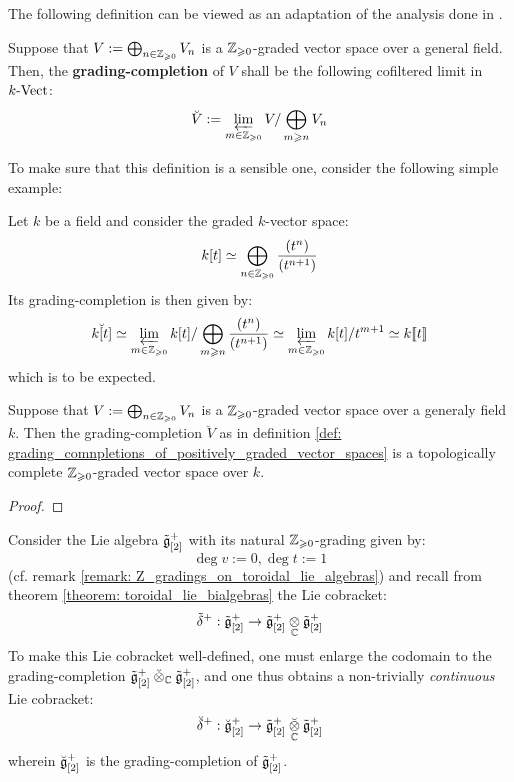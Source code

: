         The following definition can be viewed as an adaptation of the analysis done in  \cite[Appendix A]{wendlandt_formal_shift_operators_on_yangian_doubles}.
        \begin{definition} \label{def: grading_comnpletions_of_positively_graded_vector_spaces}
            Suppose that $V := \bigoplus_{n \in \mathbb{Z}_{\geqslant 0}} V_n$ is a $\mathbb{Z}_{\geqslant 0}$-graded vector space over a general field. Then, the \textbf{grading-completion} of $V$ shall be the following cofiltered limit in $k\text{-}\mathrm{Vect}$:
                $$\breve{V} := \varprojlim_{m \in \mathbb{Z}_{\geqslant 0}} V/\bigoplus_{m \geqslant n} V_n$$
        \end{definition}
        To make sure that this definition is a sensible one, consider the following simple example:
        \begin{example}
            Let $k$ be a field and consider the graded $k$-vector space:
                $$k[t] \simeq \bigoplus_{n \in \mathbb{Z}_{\geqslant 0}} \frac{(t^n)}{(t^{n + 1})}$$
            Its grading-completion is then given by:
                $$\breve{k[t]} \simeq \varprojlim_{m \in \mathbb{Z}_{\geqslant 0}} k[t]/\bigoplus_{m \geqslant n} \frac{(t^n)}{(t^{n + 1})} \simeq \varprojlim_{m \in \mathbb{Z}_{\geqslant 0}} k[t]/t^{m + 1} \simeq k[\![t]\!]$$
            which is to be expected.
        \end{example}
        \begin{lemma} \label{lemma: grading_completions_are_topologically_complete}
            Suppose that $V := \bigoplus_{n \in \mathbb{Z}_{\geqslant 0}} V_n$ is a $\mathbb{Z}_{\geqslant 0}$-graded vector space over a generaly field $k$. Then the grading-completion $\breve{V}$ as in definition \ref{def: grading_comnpletions_of_positively_graded_vector_spaces} is a topologically complete $\mathbb{Z}_{\geqslant 0}$-graded vector space over $k$.
        \end{lemma}
            \begin{proof}
                
            \end{proof}
        \begin{theorem} \label{theorem: toroidal_topological_lie_bialgebras}
            Consider the Lie algebra $\tilde{\mathfrak{g}}_{[2]}^+$ with its natural $\mathbb{Z}_{\geqslant 0}$-grading given by:
                $$\deg v := 0, \deg t := 1$$
            (cf. remark \ref{remark: Z_gradings_on_toroidal_lie_algebras}) and recall from theorem \ref{theorem: toroidal_lie_bialgebras} the Lie cobracket:
                $$\tilde{\delta}^+: \tilde{\g}_{[2]}^+ \to \tilde{\g}_{[2]}^+ \tensor_{\bbC} \tilde{\g}_{[2]}^+$$
            To make this Lie cobracket well-defined, one must enlarge the codomain to the grading-completion $\tilde{\g}_{[2]}^+ \brevetensor_{\bbC} \tilde{\g}_{[2]}^+$, and one thus obtains a non-trivially \textit{continuous} Lie cobracket:
                $$\breve{\delta}^+: \breve{\g}_{[2]}^+ \to \tilde{\g}_{[2]}^+ \brevetensor_{\bbC} \tilde{\g}_{[2]}^+$$
            wherein $\breve{\mathfrak{g}}_{[2]}^+$ is the grading-completion of $\tilde{\mathfrak{g}}_{[2]}^+$.
        \end{theorem}
    
